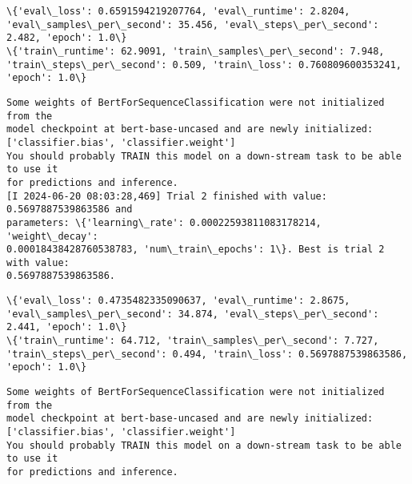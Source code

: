 \documentclass[11pt]{article}
\begin{document}
    \begin{Verbatim}[commandchars=\\\{\}]
\{'eval\_loss': 0.6591594219207764, 'eval\_runtime': 2.8204,
'eval\_samples\_per\_second': 35.456, 'eval\_steps\_per\_second': 2.482, 'epoch': 1.0\}
\{'train\_runtime': 62.9091, 'train\_samples\_per\_second': 7.948,
'train\_steps\_per\_second': 0.509, 'train\_loss': 0.760809600353241, 'epoch': 1.0\}
    \end{Verbatim}

    \begin{Verbatim}[commandchars=\\\{\}]
Some weights of BertForSequenceClassification were not initialized from the
model checkpoint at bert-base-uncased and are newly initialized:
['classifier.bias', 'classifier.weight']
You should probably TRAIN this model on a down-stream task to be able to use it
for predictions and inference.
[I 2024-06-20 08:03:28,469] Trial 2 finished with value: 0.5697887539863586 and
parameters: \{'learning\_rate': 0.00022593811083178214, 'weight\_decay':
0.00018438428760538783, 'num\_train\_epochs': 1\}. Best is trial 2 with value:
0.5697887539863586.
    \end{Verbatim}

    \begin{Verbatim}[commandchars=\\\{\}]
\{'eval\_loss': 0.4735482335090637, 'eval\_runtime': 2.8675,
'eval\_samples\_per\_second': 34.874, 'eval\_steps\_per\_second': 2.441, 'epoch': 1.0\}
\{'train\_runtime': 64.712, 'train\_samples\_per\_second': 7.727,
'train\_steps\_per\_second': 0.494, 'train\_loss': 0.5697887539863586, 'epoch': 1.0\}
    \end{Verbatim}

    \begin{Verbatim}[commandchars=\\\{\}]
Some weights of BertForSequenceClassification were not initialized from the
model checkpoint at bert-base-uncased and are newly initialized:
['classifier.bias', 'classifier.weight']
You should probably TRAIN this model on a down-stream task to be able to use it
for predictions and inference.
    \end{Verbatim}
\end{document}

